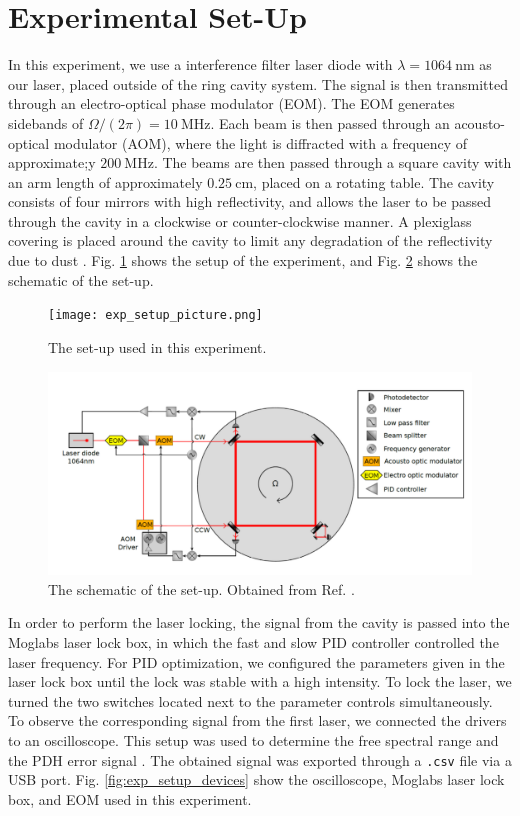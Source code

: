 \documentclass[a4paper]{report}
\numberwithin{equation}{section}
\begin{document}
\section{Experimental Set-Up}

In this experiment, we use a interference filter laser diode with $\lambda = \SI[]{1064}[]{\nano\metre}$ as our laser, placed 
outside of the ring cavity system. The signal is then transmitted through an electro-optical phase modulator (EOM). The EOM 
generates sidebands of $\Omega / (2\pi) = \SI{10}{\mega\hertz}$. Each beam is then passed through an acousto-optical modulator (AOM),
where the light is diffracted with a frequency of approximate;y $\SI[]{200}[]{\mega\hertz}$. The beams are then passed through 
a square cavity with an arm length of approximately $\SI[]{0.25}[]{\centi\metre}$, placed on a rotating table. The cavity consists of four mirrors with high
reflectivity, and allows the laser to be passed through the cavity in a clockwise or counter-clockwise manner. A plexiglass covering
is placed around the cavity to limit any degradation of the reflectivity due to dust \cite{Groh2021}. 
Fig. \ref{fig:exp_setup} shows the setup of the experiment, and Fig. \ref{fig:exp_schematic} shows the schematic of the set-up.

\begin{figure}[h!]
	\centering
	\texttt{[image: exp\_setup\_picture.png]}
	\caption{The set-up used in this experiment.}
	\label{fig:exp_setup}
\end{figure}

\begin{figure}[h!]
	\centering
	\includegraphics[width=0.8\columnwidth]{setup_schematic.png}
	\caption{The schematic of the set-up. Obtained from Ref. \cite{Groh2021}.}
	\label{fig:exp_schematic}
\end{figure}

In order to perform the laser locking, the signal from the cavity is passed into the Moglabs laser lock box, in which the fast and slow PID 
controller controlled the laser frequency. For PID optimization, we configured the parameters given in the laser lock box
until the lock was stable with a high intensity. To lock the laser, we turned the two switches located next to the parameter controls
simultaneously. To observe the corresponding signal from the first laser, we connected the drivers to an oscilloscope. This setup was used 
to determine the free spectral range and the PDH error signal \cite{Groh2021}. The obtained signal was exported through a \texttt{.csv} file
via a USB port. Fig. \ref{fig:exp_setup_devices} show the oscilloscope, Moglabs laser lock box, 
and EOM used in this experiment.\par 
\end{document}
